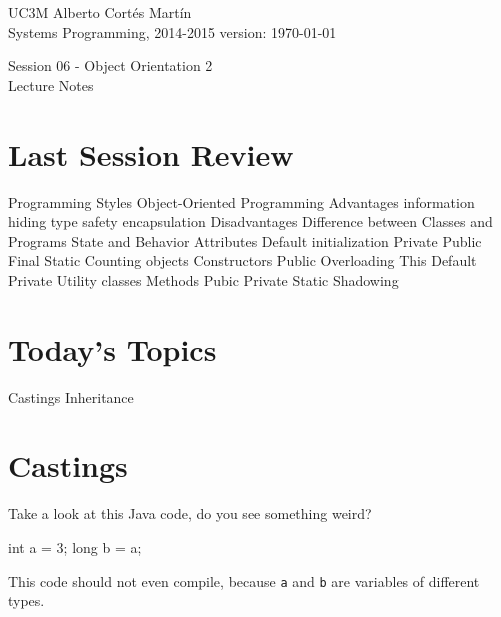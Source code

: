 \documentclass[a4paper, 9pt]{extarticle}
\newcommand{\realtitle}{Session 06 - Object Orientation 2}
\begin{document}
\makebox[\linewidth]{\rule{\textwidth}{0.4pt}}
UC3M \hfill Alberto Cortés Martín\\
Systems Programming, 2014-2015 \hfill version: \today\\
\makebox[\linewidth]{\rule{\textwidth}{0.4pt}}
\begin{center}
  \Large{\realtitle}\\Lecture Notes
\end{center}
\makebox[\linewidth]{\rule{\textwidth}{0.4pt}}
\vspace{1cm}

\section{Last Session Review}

\begin{blackboard}
Programming Styles
Object-Oriented Programming
  Advantages
    information hiding
    type safety
    encapsulation
  Disadvantages
Difference between Classes and Programs
State and Behavior
Attributes
  Default initialization
  Private
  Public
  Final
  Static
    Counting objects
Constructors
  Public
  Overloading
  This
  Default
  Private
    Utility classes
Methods
  Pubic
  Private
  Static
Shadowing
\end{blackboard}









\section{Today's Topics}
\begin{blackboard}
Castings
Inheritance
\end{blackboard}









\section{Castings}

Take a look at this Java code, do you see something weird?

\begin{blackboard}
int a = 3;
long b = a;
\end{blackboard}

This code should not even compile, because \verb+a+ and \verb+b+ are variables
of different types.
\end{document}
